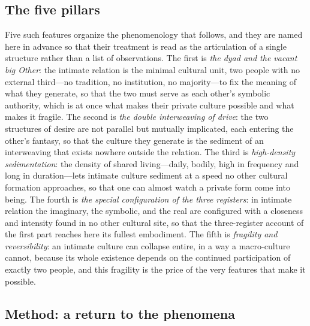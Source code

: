 \subsection*{The five pillars}

Five such features organize the phenomenology that follows, and they are named here in advance so that their treatment is read as the articulation of a single structure rather than a list of observations. The first is \emph{the dyad and the vacant big Other}: the intimate relation is the minimal cultural unit, two people with no external third---no tradition, no institution, no majority---to fix the meaning of what they generate, so that the two must serve as each other's symbolic authority, which is at once what makes their private culture possible and what makes it fragile. The second is \emph{the double interweaving of drive}: the two structures of desire are not parallel but mutually implicated, each entering the other's fantasy, so that the culture they generate is the sediment of an interweaving that exists nowhere outside the relation. The third is \emph{high-density sedimentation}: the density of shared living---daily, bodily, high in frequency and long in duration---lets intimate culture sediment at a speed no other cultural formation approaches, so that one can almost watch a private form come into being. The fourth is \emph{the special configuration of the three registers}: in intimate relation the imaginary, the symbolic, and the real are configured with a closeness and intensity found in no other cultural site, so that the three-register account of the first part reaches here its fullest embodiment. The fifth is \emph{fragility and reversibility}: an intimate culture can collapse entire, in a way a macro-culture cannot, because its whole existence depends on the continued participation of exactly two people, and this fragility is the price of the very features that make it possible.

\subsection*{Method: a return to the phenomena}

